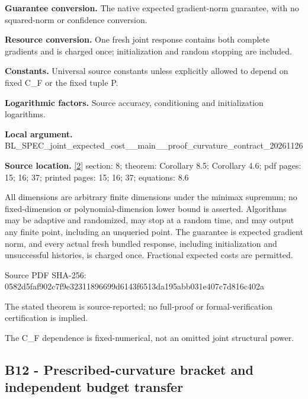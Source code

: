 \documentclass[10pt,a4paper]{article}
\begin{document}
\textbf{Guarantee conversion.} The native expected gradient-norm guarantee, with no squared-norm or confidence conversion.



\textbf{Resource conversion.} One fresh joint response contains both complete gradients and is charged once; initialization and random stopping are included.



\textbf{Constants.} Universal source constants unless explicitly allowed to depend on fixed C\_F or the fixed tuple P.



\textbf{Logarithmic factors.} Source accuracy, conditioning and initialization logarithms.



\textbf{Local argument.} BL\_SPEC\_joint\_expected\_c\allowbreak{}ost\_\_main\_\_proof\_curvatu\allowbreak{}re\_contract\_20261126



\textbf{Source location.} \href{https://github.com/WU-Wendao/Colombo/blob/main/colombo_sensorium/Complexity_altas/data/sources/colombo/SFO_JOINT_20261126/manuscript.pdf}{[2]} section: 8; theorem: Corollary 8.5; Corollary 4.6; pdf pages: 15; 16; 37; printed pages: 15; 16; 37; equations: 8.6



All dimensions are arbitrary finite dimensions under the minimax supremum; no fixed-dimension or polynomial-dimension lower bound is asserted. Algorithms may be adaptive and randomized, may stop at a random time, and may output any finite point, including an unqueried point. The guarantee is expected gradient norm, and every actual fresh bundled response, including initialization and unsuccessful histories, is charged once. Fractional expected costs are permitted.



Source PDF SHA-256: 0582d5faf902c7f9e3231189\allowbreak{}6699d6143f6513da195abb03\allowbreak{}1e407c7d816c402a



The stated theorem is source-reported; no full-proof or formal-verification certification is implied.



The C\_F dependence is fixed-numerical, not an omitted joint structural power.



\subsection{B12 - Prescribed-curvature bracket and independent budget transfer}
\end{document}
